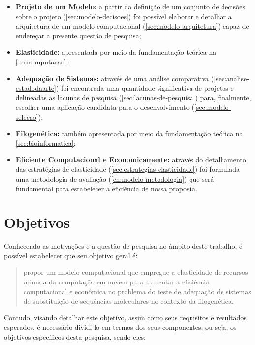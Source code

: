 \documentclass[english,brazilian]{UNISINOSmonografia} %
\begin{document}
\begin{itemize}
	
	\item \textbf{Projeto de um Modelo:} a partir da definição de um conjunto de decisões sobre o projeto (\autoref{sec:modelo-decisoes}) foi possível elaborar e detalhar a arquitetura de um modelo computacional (\autoref{sec:modelo-arquitetura}) capaz de endereçar a presente questão de pesquisa;
	
	\item \textbf{Elasticidade:} apresentada por meio da fundamentação teórica na \autoref{sec:computacao};
	
	\item \textbf{Adequação de Sistemas:} através de uma análise comparativa (\autoref{sec:analise-estadodaarte}) foi encontrada uma quantidade significativa de projetos e delineadas as lacunas de pesquisa (\autoref{sec:lacunas-de-pesquisa}) para, finalmente, escolher uma aplicação candidata para o desenvolvimento (\autoref{sec:modelo-selecao});
	
	\item \textbf{Filogenética:} também apresentada por meio da fundamentação teórica na \autoref{sec:bioinformatica};
	
	\item \textbf{Eficiente Computacional e Economicamente:} através do detalhamento das estratégias de elasticidade (\autoref{sec:estrategias-elasticidade}) foi formulada uma metodologia de avaliação (\autoref{ch:modelo-metodologia}) que será fundamental para estabelecer a eficiência de nossa proposta.
\end{itemize}



\section{Objetivos}
\label{sec:objetivos}



Conhecendo as motivações e a questão de pesquisa no âmbito deste trabalho, é possível estabelecer que seu objetivo geral é:
\begin{quote}
	\large
	propor um modelo computacional que empregue a elasticidade de recursos oriunda da computação em nuvem para aumentar a eficiência computacional e econômica no problema do teste de adequação de sistemas de substituição de sequências moleculares no contexto da filogenética.
\end{quote}
Contudo, visando detalhar este objetivo, assim como seus requisitos e resultados esperados, é necessário dividi-lo em termos dos seus componentes, ou seja, os objetivos específicos desta pesquisa, sendo eles:
\end{document}
